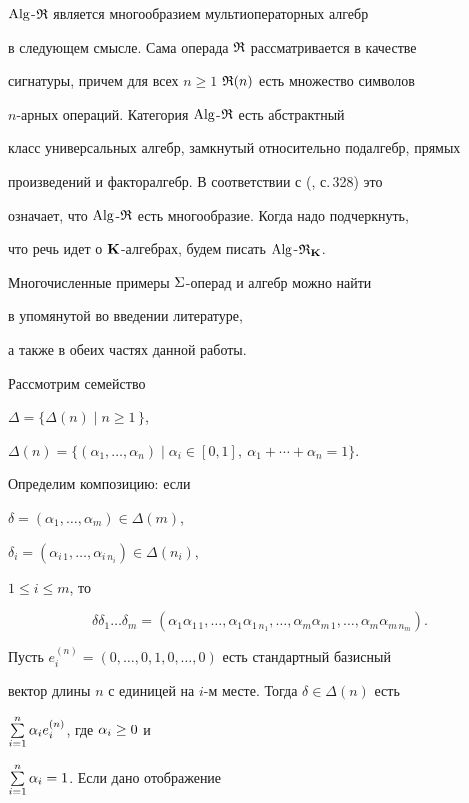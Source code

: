 $\Alg$-$\R$ является многообразием мультиоператорных алгебр


в следующем смысле. Сама операда $\R$ рассматривается в качестве


сигнатуры, причем для всех $n\ge 1$\; $\R(n)$ есть множество символов


$n$-арных операций. Категория $\Alg$-$\R$ есть абстрактный


класс универсальных алгебр, замкнутый относительно подалгебр, прямых


произведений и факторалгебр. В соответствии с (\cite{TCl}, с.\,328) это


означает, что $\Alg$-$\R$ есть многообразие. Когда надо подчеркнуть,


что речь идет о $\P$-алгебрах, будем писать $\Alg$-$\R_{\bold K}$.


Многочисленные примеры $\sym$-операд и алгебр можно найти


в упомянутой во введении литературе,


а также в обеих частях данной работы.





Рассмотрим семейство


$\Delta=\{\Delta(n) \mid n\ge 1\,\}$,


$\Delta(n)=\{(\alpha_1,\dotsc,\alpha_n)\mid \alpha_i\in [0,1],


\ \alpha_1+\dotsb+\alpha_n=1\}$.


Определим композицию: если


$\delta=(\alpha_1,\dotsc,\alpha_m)\in \Delta(m)$,


$\delta_i=(\alpha_{i\, 1},\dotsc,\alpha_{i\,n_i})\in \Delta(n_i)$,


$1\leq i\leq m$, то


$$


\delta\delta_1\dotsc \delta_m=


(\alpha_1\alpha_{1\,1},\dotsc,\alpha_1\alpha_{1\,n_1},\dotsc,


\alpha_m\alpha_{m\,1},\dotsc,\alpha_m\alpha_{m\,n_m}).


$$


Пусть $e_i^{(n)}=(0,\dotsc,0, 1,0,\dotsc,0)$ есть стандартный базисный


вектор длины $n$ с единицей на $i$-м месте. Тогда $\delta\in \Delta(n)$ есть


$\sum\limits_{i=1}^n \al_i e_i^{(n)}$, где $\al_i\ge 0$ и


$\sum\limits_{i=1}^n \al_i =1$. Если дано отображение


